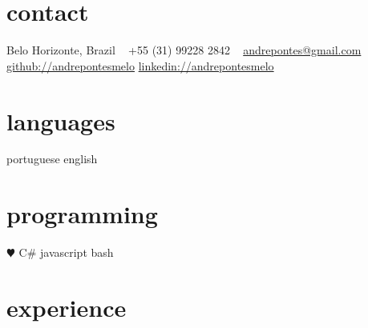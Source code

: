 \documentclass[]{friggeri-cv-a4}
\begin{document}


\begin{aside} %
\section{contact}
Belo Horizonte, Brazil
~
+55 (31) 99228 2842
~
\href{mailto:andrepontes@gmail.com}{andrepontes@gmail.com}
\href{http://github.com/andrepontesmelo}{github://andrepontesmelo}
\href{http://linkedin.com/in/andrepontesmelo}{linkedin://andrepontesmelo}
\section{languages}
portuguese 
english
\section{programming}
{\color{red} $\varheartsuit$} C\#
javascript
bash
\end{aside}


\section{experience}
\end{document}
